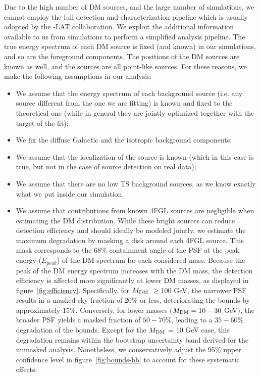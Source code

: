 Due to the high number of DM sources, and the large number of simulations, we cannot employ the full detection and characterization pipeline which is usually adopted by the \Fermi-LAT collaboration.
We exploit the additional information available to us from simulations to perform a simplified analysis pipeline. 
The true energy spectrum of each DM source is fixed (and known) in our simulations, and so are the foreground components. The positions of the DM sources are known as well, and the sources are all point-like sources. For these reasons, we make the following assumptions in our analysis:
\begin{itemize}
    \item We assume that the energy spectrum of each background source (i.e. any source different from the one we are fitting) is known and fixed to the theoretical one (while in general they are jointly optimized together with the target of the fit);
    \item We fix the diffuse Galactic and the isotropic background components;
    \item We assume that the localization of the source is known (which in this case is true, but not in the case of source detection on real data);
    \item We assume that there are no low TS background sources, as we know exactly what we put inside our simulation.
    \item {We assume that contributions from known 4FGL sources are negligible when estimating the DM distribution. While these bright sources can reduce detection efficiency and should ideally be modeled jointly, we estimate the maximum degradation by masking a disk around each 4FGL source. 
    This mask corresponds to the 68\% containment angle of the PSF at the peak energy ($E_{peak}$) of the DM spectrum for each considered mass. Because the peak of the DM energy spectrum increases with the DM mass, the detection efficiency is affected more significantly at lower DM masses, as displayed in figure~\ref{fig:efficiency}. Specifically, for ${M_\textrm{DM}}$ $\geq$100 GeV, the narrower PSF results in a masked sky fraction of 20\% or less, deteriorating the bounds by approximately 15\%. 
    Conversely, for lower masses (${M_\textrm{DM}} = 10 - 30$ GeV), the broader PSF yields a masked fraction of $50 - 70$\%, leading to a $35 - 60$\% degradation of the bounds. 
    Except for the ${M_\textrm{DM}}$ = 10 GeV case, this degradation remains within the bootstrap uncertainty band derived for the unmasked analysis. Nonetheless, we conservatively adjust the 95\% upper confidence level in figure~\ref{fig:bounds-bb} to account for these systematic effects.}
\end{itemize}

